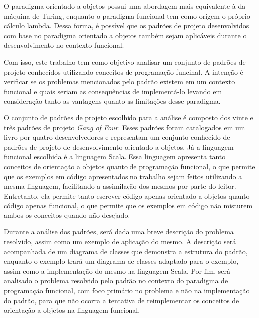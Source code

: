 
O paradigma orientado a objetos possui uma 
abordagem mais equivalente à da máquina de Turing, 
enquanto o paradigma funcional 
tem como origem o próprio cálculo lambda. 
Dessa forma, é possível que os padrões de 
projeto desenvolvidos com base no paradigma 
orientado a objetos também sejam aplicáveis 
durante o desenvolvimento no contexto funcional. 


Com isso, este trabalho tem como objetivo 
analisar um conjunto de padrões de projeto 
conhecidos utilizando conceitos de programação 
funcinal. A intenção é verificar se os 
problemas mencionados pelo padrão existem 
em um contexto funcional e quais 
seriam as consequências de implementá-lo 
levando em consideração tanto as vantagens 
quanto as limitações desse paradigma.


O conjunto de padrões de projeto escolhido 
para a análise é composto dos vinte e três 
padrões de projeto \textit{Gang of Four}. 
Esses padrões foram catalogados em um livro 
por quatro desenvolvedores e representam 
um conjunto conhecido de padrões de projeto 
de desenvolvimento orientado a objetos. 
Já a linguagem funcional escolhida é a 
linguagem Scala. Essa linguagem 
apresenta tanto conceitos de orientação 
a objetos quanto de programação funcional, 
o que permite que os exemplos em código 
apresentados no trabalho sejam feitos 
utilizando a mesma linguagem, facilitando 
a assimilação dos mesmos por parte do 
leitor. Entretanto, ela permite tanto 
escrever código apenas orientado a 
objetos quanto código apenas funcional, 
o que permite que os exemplos em 
código não misturem ambos os conceitos 
quando não desejado.


Durante a análise dos padrões, será 
dada uma breve descrição do problema 
resolvido, assim como um exemplo de aplicação 
do mesmo. A descrição será acompanhada de 
um diagrama de classes que demonstra a 
estrutura do padrão, enquanto o exemplo 
trará um diagrama de classes adaptado 
para o exemplo, assim como a implementação 
do mesmo na linguagem Scala. Por fim, será 
analisado o problema resolvido pelo padrão 
no contexto do paradigma de programação 
funcional, com foco primário no problema 
e não na implementação do padrão, para que 
não ocorra a tentativa de reimplementar os 
conceitos de orientação a objetos na 
linguagem funcional. 


